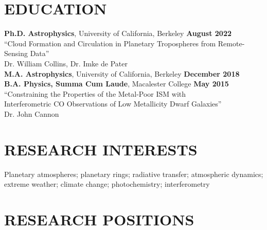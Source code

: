 \documentclass[margin, 10pt]{res} %
\newcommand\tab[1][1cm]{\hspace*{#1}}
\begin{document}
\begin{resume}
 

\section{EDUCATION}

{\bf Ph.D. Astrophysics}, University of California, Berkeley \hfill
{\bf August 2022} \\
\tab {\it Thesis:} ``Cloud Formation and Circulation in Planetary Tropospheres %
from Remote-Sensing Data'' \\
\tab {\it Advisers:} Dr. William Collins, Dr. Imke de Pater \\
{\bf M.A. Astrophysics}, University of California, Berkeley \hfill
{\bf December 2018} \\
{\bf B.A. Physics, Summa Cum Laude}, Macalester College \hfill {\bf
  May 2015} \\
\tab {\it Thesis:}  ``Constraining the Properties of the Metal-Poor
ISM with \\ \tab \tab \tab Interferometric CO Observations of Low Metallicity Dwarf
Galaxies'' \\
\tab {\it Adviser:} Dr. John Cannon


\section{RESEARCH INTERESTS}
Planetary atmospheres; planetary rings; radiative transfer; atmospheric dynamics; extreme weather; climate change; photochemistry; interferometry


\section{RESEARCH POSITIONS}


\end{resume}
\end{document}
